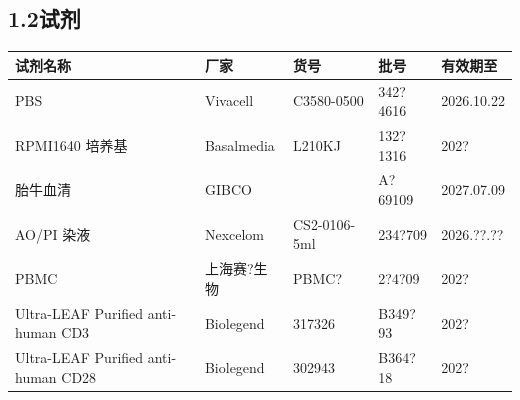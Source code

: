 \documentclass[UTF8,10pt,a4paper,fontset=fandol]{ctexart}
\newcommand{\fieldvalue}[1]{#1}
\newcommand{\handwritten}[1]{#1}
\begin{document}
\begin{center}
\begin{center}
\subsection{1.2\quad 试剂}

\begin{tabularx}{\textwidth}{|X|X|X|X|X|}
\hline
试剂名称 & 厂家 & 货号 & 批号 & 有效期至\\
\hline
PBS & Vivacell & C3580-0500 &
\fieldvalue{\handwritten{342?4616}} &
\fieldvalue{\handwritten{2026.10.22}}\\
\hline
RPMI1640 培养基 & Basalmedia & L210KJ &
\fieldvalue{\handwritten{132?1316}} &
\fieldvalue{\handwritten{202?}}\\
\hline
胎牛血清 & GIBCO & &
\fieldvalue{\handwritten{A?69109}} &
\fieldvalue{\handwritten{2027.07.09}}\\
\hline
AO/PI 染液 & Nexcelom & CS2-0106-5ml &
\fieldvalue{\handwritten{234?709}} &
\fieldvalue{\handwritten{2026.??.??}}\\
\hline
PBMC & 上海赛?生物 &
\fieldvalue{\handwritten{PBMC?}} &
\fieldvalue{\handwritten{2?4?09}} &
\fieldvalue{\handwritten{202?}}\\
\hline
Ultra-LEAF Purified anti-human CD3 & Biolegend & 317326 &
\fieldvalue{\handwritten{B349?93}} &
\fieldvalue{\handwritten{202?}}\\
\hline
Ultra-LEAF Purified anti-human CD28 & Biolegend & 302943 &
\fieldvalue{\handwritten{B364?18}} &
\fieldvalue{\handwritten{202?}}\\
\hline
\end{tabularx}


\end{center}
\end{center}
\end{document}
